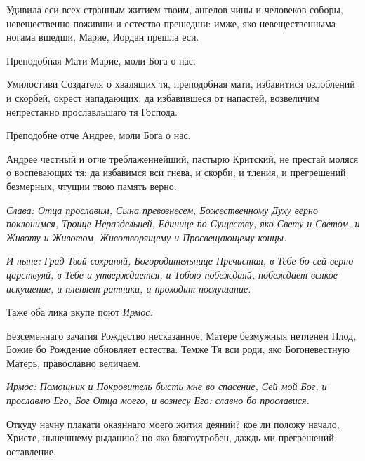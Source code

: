 \normalfont{}

Удивила еси всех странным житием твоим, ангелов чины и человеков соборы, невещественно поживши и естество прешедши: имже, яко невещественныма ногама вшедши, Марие, Иордан прешла еси. 

\bfseries 

Преподобная Мати Марие, моли Бога о нас.

\normalfont{}

Умилостиви Создателя о хвалящих тя, преподобная мати, избавитися озлоблений и скорбей, окрест нападающих: да избавившеся от напастей, возвеличим непрестанно прославльшаго тя Господа. 

\bfseries 

Преподобне отче Андрее, моли Бога о нас.

\normalfont{}

Андрее честный и отче треблаженнейший, пастырю Критский, не престай моляся о воспевающих тя: да избавимся вси гнева, и скорби, и тления, и прегрешений безмерных, чтущии твою память верно. 

\itshape Слава\normalfont{}: Отца прославим, Сына превознесем, Божественному Духу верно поклонимся, Троице Нераздельней, Единице по Существу, яко Свету и Светом, и Животу и Животом, Животворящему и Просвещающему концы. 

\itshape И ныне\normalfont{}: Град Твой сохраняй, Богородительнице Пречистая, в Тебе бо сей верно царствуяй, в Тебе и утверждается, и Тобою побеждаяй, побеждает всякое искушение, и пленяет ратники, и проходит послушание. 

Таже оба лика вкупе поют \itshape Ирмос\normalfont{}: 

Безсеменнаго зачатия Рождество несказанное, Матере безмужныя нетленен Плод, Божие бо Рождение обновляет естества. Темже Тя вси роди, яко Богоневестную Матерь, православно величаем.



\mychapterending

 


\itshape Ирмос\normalfont{}: Помощник и Покровитель бысть мне во спасение, Сей мой Бог, и прославлю Его, Бог Отца моего, и вознесу Его: славно бо прославися.


Откуду начну плакати окаяннаго моего жития деяний? кое ли положу начало, Христе, нынешнему рыданию? но яко благоутробен, даждь ми прегрешений оставление.


